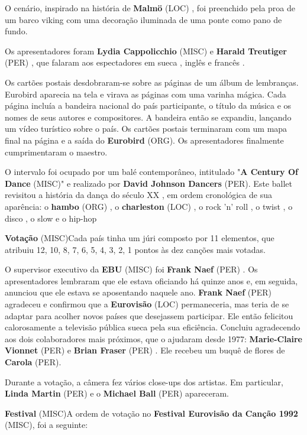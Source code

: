 \documentclass[12pt,a4paper]{article}
\begin{document}
O cenário, inspirado na história de \textbf{Malmö} (LOC) , foi preenchido pela proa de um barco viking com uma decoração iluminada de uma ponte como pano de fundo.

Os apresentadores foram \textbf{Lydia Cappolicchio} (MISC) e \textbf{Harald Treutiger} (PER) , que falaram aos espectadores em sueca , inglês e francês .

Os cartões postais desdobraram-se sobre as páginas de um álbum de lembranças. Eurobird aparecia na tela e virava as páginas com uma varinha mágica. Cada página incluía a bandeira nacional do país participante, o título da música e os nomes de seus autores e compositores. A bandeira então se expandiu, lançando um vídeo turístico sobre o país. Os cartões postais terminaram com um mapa final na página e a saída do \textbf{Eurobird} (ORG). Os apresentadores finalmente cumprimentaram o maestro.

O intervalo foi ocupado por um balé contemporâneo, intitulado "\textbf{A Century Of Dance} (MISC)" e realizado por \textbf{David Johnson Dancers} (PER). Este ballet revisitou a história da dança do século XX , em ordem cronológica de sua aparência: o \textbf{hambo} (ORG) , o \textbf{charleston} (LOC) , o rock 'n' roll , o twist , o disco , o slow e o hip-hop



\textbf{Votação} (MISC)Cada país tinha um júri composto por 11 elementos, que atribuiu 12, 10, 8, 7, 6, 5, 4, 3, 2, 1 pontos às dez canções mais votadas.

O supervisor executivo da \textbf{EBU} (MISC) foi \textbf{Frank Naef} (PER) . Os apresentadores lembraram que ele estava oficiando há quinze anos e, em seguida, anunciou que ele estava se aposentando naquele ano. \textbf{Frank Naef} (PER) agradeceu e confirmou que a \textbf{Eurovisão} (LOC) permaneceria, mas teria de se adaptar para acolher novos países que desejassem participar. Ele então felicitou calorosamente a televisão pública sueca pela sua eficiência. Concluiu agradecendo aos dois colaboradores mais próximos, que o ajudaram desde 1977: \textbf{Marie-Claire Vionnet} (PER) e \textbf{Brian Fraser} (PER) . Ele recebeu um buquê de flores de \textbf{Carola} (PER).

Durante a votação, a câmera fez vários close-ups dos artistas. Em particular, \textbf{Linda Martin} (PER) e o \textbf{Michael Ball} (PER) apareceram.



\textbf{Festival} (MISC)A ordem de votação no \textbf{Festival Eurovisão da Canção 1992} (MISC), foi a seguinte:
\end{document}
